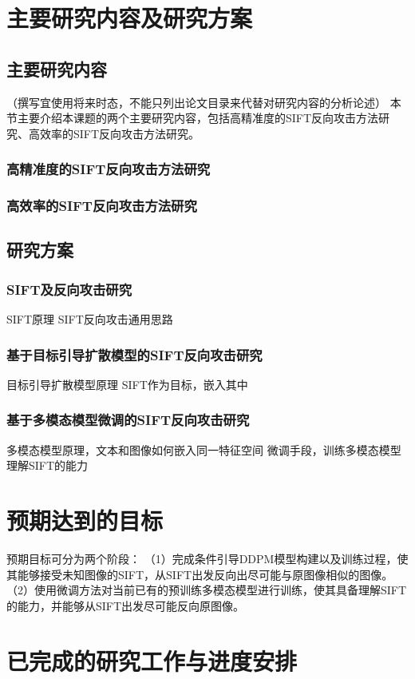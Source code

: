 \section{主要研究内容及研究方案}
\subsection{主要研究内容}
（撰写宜使用将来时态，不能只列出论文目录来代替对研究内容的分析论述）
本节主要介绍本课题的两个主要研究内容，包括高精准度的SIFT反向攻击方法研究、高效率的SIFT反向攻击方法研究。
\subsubsection{高精准度的SIFT反向攻击方法研究}
\subsubsection{高效率的SIFT反向攻击方法研究}
\subsection{研究方案}
\subsubsection{SIFT及反向攻击研究}
SIFT原理
SIFT反向攻击通用思路
\subsubsection{基于目标引导扩散模型的SIFT反向攻击研究}
目标引导扩散模型原理
SIFT作为目标，嵌入其中
\subsubsection{基于多模态模型微调的SIFT反向攻击研究}
多模态模型原理，文本和图像如何嵌入同一特征空间
微调手段，训练多模态模型理解SIFT的能力
\section{预期达到的目标}
预期目标可分为两个阶段：
（1）完成条件引导DDPM模型构建以及训练过程，使其能够接受未知图像的SIFT，从SIFT出发反向出尽可能与原图像相似的图像。
（2）使用微调方法对当前已有的预训练多模态模型进行训练，使其具备理解SIFT的能力，并能够从SIFT出发尽可能反向原图像。


\section{已完成的研究工作与进度安排}
